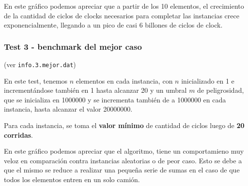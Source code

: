 \vspace*{0.5cm}

En este gráfico podemos apreciar que a partir de los 10 elementos, el
crecimiento de la cantidad de ciclos de clocks necesarios para completar las
instancias crece exponencialmente, llegando a un pico de casi 6 billones de
ciclos de clock.


\newpage
\subsubsection{Test 3 - benchmark del mejor caso}

(ver \verb|info.3.mejor.dat|) \medskip

En este test, tenemos $n$ elementos en cada instancia, con $n$ inicializado en 1 e incrementándose
también en 1 hasta alcanzar 20 y un umbral $m$ de peligrosidad, que se inicializa en 1000000 y se incrementa
también de a 1000000 en cada instancia, hasta alcanzar el valor 20000000.

Para cada instancia, se toma el \textbf{valor mínimo} de cantidad de ciclos luego de \textbf{20 corridas}.




En este gráfico podemos apreciar que el algoritmo, tiene un comportamieno
muy veloz en comparación contra instancias aleatorias o de peor caso. Esto
se debe a que el mismo se reduce a realizar una pequeña serie de sumas en el
caso de que todos los elementos entren en un solo camión.
